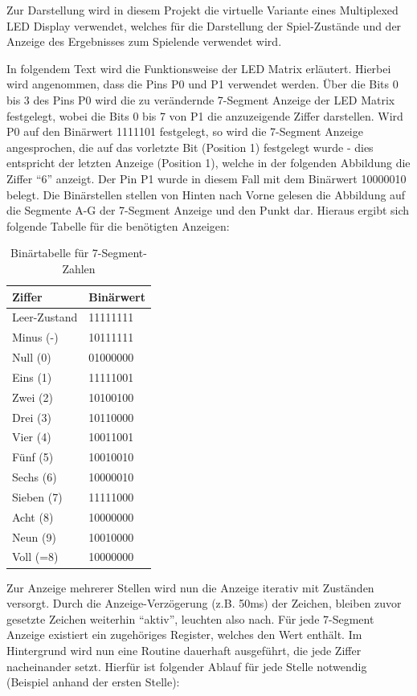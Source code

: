 \documentclass[11pt,ngerman]{report}
\begin{document}
Zur Darstellung wird in diesem Projekt die virtuelle Variante eines Multiplexed LED Display verwendet, welches für die Darstellung der Spiel-Zustände und der Anzeige des Ergebnisses zum Spielende verwendet wird.

In folgendem Text wird die Funktionsweise der LED Matrix erläutert. Hierbei wird angenommen, dass die Pins P0 und P1 verwendet werden. Über die Bits 0 bis 3 des Pins P0 wird die zu verändernde 7-Segment Anzeige der LED Matrix festgelegt, wobei die Bits 0 bis 7 von P1 die anzuzeigende Ziffer darstellen.
Wird P0 auf den Binärwert 1111101 festgelegt, so wird die 7-Segment Anzeige angesprochen, die auf das vorletzte Bit (Position 1) festgelegt wurde - dies entspricht der letzten Anzeige (Position 1), welche in der folgenden Abbildung die Ziffer “6” anzeigt. Der Pin P1 wurde in diesem Fall mit dem Binärwert 10000010 belegt. Die Binärstellen stellen von Hinten nach Vorne gelesen die Abbildung auf die Segmente A-G der 7-Segment Anzeige und den Punkt dar. Hieraus ergibt sich folgende Tabelle für die benötigten Anzeigen:

\begin{table}[]
	\centering
	\caption{Binärtabelle für 7-Segment-Zahlen}
	\begin{tabular}{@{}ll@{}}
		\toprule
		Ziffer       & Binärwert \\ \midrule
		Leer-Zustand & 11111111  \\
		Minus (-)    & 10111111  \\
		Null (0)     & 01000000  \\
		Eins (1)     & 11111001  \\
		Zwei (2)     & 10100100  \\
		Drei (3)     & 10110000  \\
		Vier (4)     & 10011001  \\
		Fünf (5)     & 10010010  \\
		Sechs (6)    & 10000010  \\
		Sieben (7)   & 11111000  \\
		Acht (8)     & 10000000  \\
		Neun (9)     & 10010000  \\
		Voll (=8)    & 10000000  \\ \bottomrule
	\end{tabular}
\end{table}

Zur Anzeige mehrerer Stellen wird nun die Anzeige iterativ mit Zuständen versorgt. Durch die Anzeige-Verzögerung (z.B. 50ms) der Zeichen, bleiben zuvor gesetzte Zeichen weiterhin “aktiv”, leuchten also nach. Für jede 7-Segment Anzeige existiert ein zugehöriges Register, welches den Wert enthält. Im Hintergrund wird nun eine Routine dauerhaft ausgeführt, die jede Ziffer nacheinander setzt. Hierfür ist folgender Ablauf für jede Stelle notwendig (Beispiel anhand der ersten Stelle):
\end{document}
